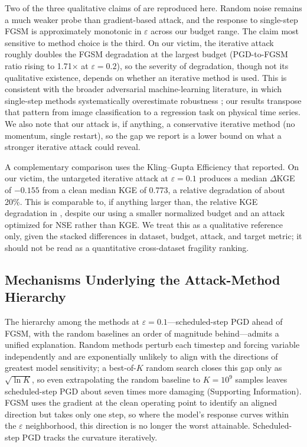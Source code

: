 \documentclass[final]{agujournal2019}
\begin{document}
Two of the three qualitative claims of  are reproduced here. Random noise remains a much weaker probe than gradient-based attack, and the response to single-step FGSM is approximately monotonic in $\varepsilon$ across our budget range. The claim most sensitive to method choice is the third. On our victim, the iterative attack roughly doubles the FGSM degradation at the largest budget (PGD-to-FGSM ratio rising to 1.71$\times$ at $\varepsilon = 0.2$), so the severity of degradation, though not its qualitative existence, depends on whether an iterative method is used. This is consistent with the broader adversarial machine-learning literature, in which single-step methods systematically overestimate robustness \cite{Carlini2019}; our results transpose that pattern from image classification to a regression task on physical time series. We also note that our attack is, if anything, a conservative iterative method (no momentum, single restart), so the gap we report is a lower bound on what a stronger iterative attack could reveal.

A complementary comparison uses the Kling--Gupta Efficiency that  reported. On our victim, the untargeted iterative attack at $\varepsilon = 0.1$ produces a median $\Delta$KGE of $-0.155$ from a clean median KGE of 0.773, a relative degradation of about 20\%. This is comparable to, if anything larger than, the relative KGE degradation in , despite our using a smaller normalized budget and an attack optimized for NSE rather than KGE. We treat this as a qualitative reference only, given the stacked differences in dataset, budget, attack, and target metric; it should not be read as a quantitative cross-dataset fragility ranking.

\subsection{Mechanisms Underlying the Attack-Method Hierarchy}

The hierarchy among the methods at $\varepsilon = 0.1$---scheduled-step PGD ahead of FGSM, with the random baselines an order of magnitude behind---admits a unified explanation. Random methods perturb each timestep and forcing variable independently and are exponentially unlikely to align with the directions of greatest model sensitivity; a best-of-$K$ random search closes this gap only as $\sqrt{\ln K}$, so even extrapolating the random baseline to $K = 10^9$ samples leaves scheduled-step PGD about seven times more damaging (Supporting Information). FGSM uses the gradient at the clean operating point to identify an aligned direction but takes only one step, so where the model's response curves within the $\varepsilon$ neighborhood, this direction is no longer the worst attainable. Scheduled-step PGD tracks the curvature iteratively.
\end{document}
